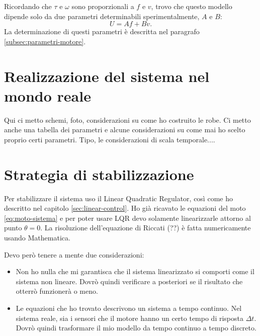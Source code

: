 Ricordando che $\tau$ e $\omega$ sono proporzionali a $f$ e $v$, trovo che questo modello dipende solo da due parametri determinabili sperimentalmente, $A$ e $B$:
\begin{equation*}
    U = A f + B v.
\end{equation*}
La determinazione di questi parametri è descritta nel paragrafo \ref{subsec:parametri-motore}.



\section{Realizzazione del sistema nel mondo reale}
\label{sec:sistema-reale}
Qui ci metto schemi, foto, considerazioni su come ho costruito le robe. Ci metto anche una tabella dei parametri e alcune considerazioni su come mai ho scelto proprio certi parametri. Tipo, le considerazioni di scala temporale.... 



\section{Strategia di stabilizzazione}
\label{sec:strategia-stabilizzazione}
Per stabilizzare il sistema uso il Linear Quadratic Regulator, così come ho descritto nel capitolo \ref{sec:linear-control}. Ho già ricavato le equazioni del moto \eqref{eq:moto-sistema} e per poter usare LQR devo solamente linearizzarle attorno al punto $\theta = 0$. La risoluzione dell'equazione di Riccati (??)  è fatta numericamente usando Mathematica.

Devo però tenere a mente due considerazioni:
\begin{itemize}
    \item Non ho nulla che mi garantisca che il sistema linearizzato si comporti come il sistema non lineare. Dovrò quindi verificare a posteriori se il risultato che otterrò funzionerà o meno. 
    
    \item Le equazioni che ho trovato descrivono un sistema a tempo continuo. Nel sistema reale, sia i sensori che il motore hanno un certo tempo di risposta $\Delta t$. Dovrò quindi trasformare il mio modello da tempo continuo a tempo discreto.
\end{itemize}

